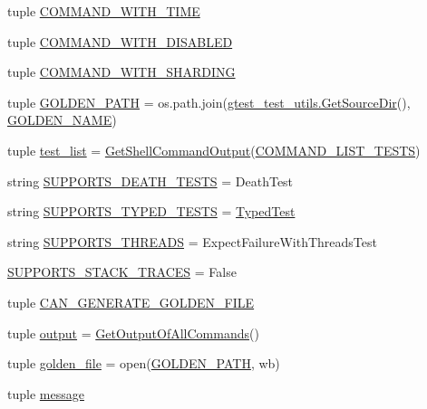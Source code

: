 \begin{DoxyCompactItemize}
\item 
tuple \hyperlink{namespacegtest__output__test_a1c27d93a57990d21461436f2d5ff3064}{C\+O\+M\+M\+A\+N\+D\+\_\+\+W\+I\+T\+H\+\_\+\+T\+I\+M\+E}
\item 
tuple \hyperlink{namespacegtest__output__test_a0ef963a39dc8e53616ba2dab9f128def}{C\+O\+M\+M\+A\+N\+D\+\_\+\+W\+I\+T\+H\+\_\+\+D\+I\+S\+A\+B\+L\+E\+D}
\item 
tuple \hyperlink{namespacegtest__output__test_a462eef2a00782001d491b7a38a847bec}{C\+O\+M\+M\+A\+N\+D\+\_\+\+W\+I\+T\+H\+\_\+\+S\+H\+A\+R\+D\+I\+N\+G}
\item 
tuple \hyperlink{namespacegtest__output__test_ad37256f6954485deb074fd47ba08e84b}{G\+O\+L\+D\+E\+N\+\_\+\+P\+A\+T\+H} = os.\+path.\+join(\hyperlink{namespacegtest__test__utils_aaff66cb0980804d8bd57dc719d4b5518}{gtest\+\_\+test\+\_\+utils.\+Get\+Source\+Dir}(), \hyperlink{namespacegtest__output__test_a317ece7d11d9103a7bdbf0320b64a981}{G\+O\+L\+D\+E\+N\+\_\+\+N\+A\+M\+E})
\item 
tuple \hyperlink{namespacegtest__output__test_a2da84cfb32bbb8634f1f5853795d6051}{test\+\_\+list} = \hyperlink{namespacegtest__output__test_a0dbdd37611259249a58ab13ed60d8172}{Get\+Shell\+Command\+Output}(\hyperlink{namespacegtest__output__test_ad57de209fb07e1002c8a929dd8a15dc9}{C\+O\+M\+M\+A\+N\+D\+\_\+\+L\+I\+S\+T\+\_\+\+T\+E\+S\+T\+S})
\item 
string \hyperlink{namespacegtest__output__test_a401e837dae10d6c728bd74684884a77f}{S\+U\+P\+P\+O\+R\+T\+S\+\_\+\+D\+E\+A\+T\+H\+\_\+\+T\+E\+S\+T\+S} = \textquotesingle{}Death\+Test\textquotesingle{}
\item 
string \hyperlink{namespacegtest__output__test_aa762abdf62ac6efe1aa2405b3f506380}{S\+U\+P\+P\+O\+R\+T\+S\+\_\+\+T\+Y\+P\+E\+D\+\_\+\+T\+E\+S\+T\+S} = \textquotesingle{}\hyperlink{class_typed_test}{Typed\+Test}\textquotesingle{}
\item 
string \hyperlink{namespacegtest__output__test_a9c611ee196914defbb5d32a47c606640}{S\+U\+P\+P\+O\+R\+T\+S\+\_\+\+T\+H\+R\+E\+A\+D\+S} = \textquotesingle{}Expect\+Failure\+With\+Threads\+Test\textquotesingle{}
\item 
\hyperlink{namespacegtest__output__test_a0bab477a98b8f74922a43ca21f4fca13}{S\+U\+P\+P\+O\+R\+T\+S\+\_\+\+S\+T\+A\+C\+K\+\_\+\+T\+R\+A\+C\+E\+S} = False
\item 
tuple \hyperlink{namespacegtest__output__test_aa370a0da630f54a564d79507df196854}{C\+A\+N\+\_\+\+G\+E\+N\+E\+R\+A\+T\+E\+\_\+\+G\+O\+L\+D\+E\+N\+\_\+\+F\+I\+L\+E}
\item 
tuple \hyperlink{namespacegtest__output__test_a7d428bb6e16eda248484d1428715858b}{output} = \hyperlink{namespacegtest__output__test_a9d88a4a9a91b97a369abac2170a23ebe}{Get\+Output\+Of\+All\+Commands}()
\item 
tuple \hyperlink{namespacegtest__output__test_ae163d7a6ccbd6e49abe6982a89c3bca9}{golden\+\_\+file} = open(\hyperlink{namespacegtest__output__test_ad37256f6954485deb074fd47ba08e84b}{G\+O\+L\+D\+E\+N\+\_\+\+P\+A\+T\+H}, \textquotesingle{}wb\textquotesingle{})
\item 
tuple \hyperlink{namespacegtest__output__test_ac696d0798ad7d08cb2e61070824750e2}{message}
\end{DoxyCompactItemize}


